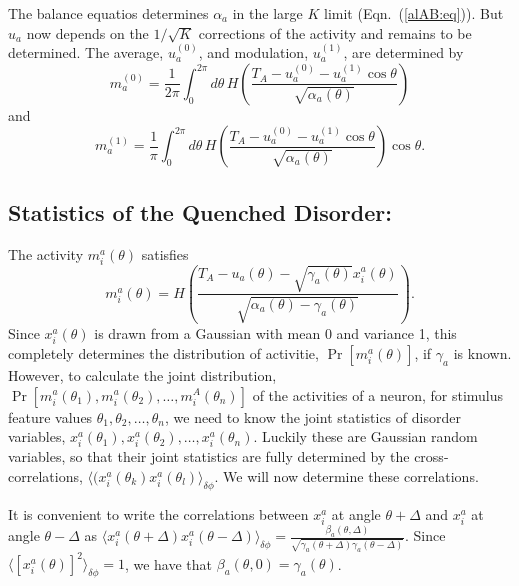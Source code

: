 The balance equatios determines $\alpha_a$ in the large $K$ limit (Eqn.~(\ref{alAB:eq})). 
But $u_a$ now depends on 
the $1/\sqrt{K}$ corrections of the activity and remains to be determined. 
The average, $u_a^{(0)}$, and modulation, $u_a^{(1)}$, are determined by
\begin{equation}
m_a^{(0)}=\frac{1}{2\pi}\int_0^{2\pi}\!d\theta\,
H\left(\frac{T_A-u_a^{(0)}-u_a^{(1)}\cos \theta}{\sqrt{\alpha_a(\theta)}}
\right)
\end{equation}
and
\begin{equation}
m_a^{(1)}=\frac{1}{\pi}\int_0^{2\pi}\!d\theta\,
H\left(\frac{T_A-u_a^{(0)}-u_a^{(1)}\cos \theta}{\sqrt{\alpha_a(\theta)}}
\right)\cos \theta.
\end{equation}

\subsection{Statistics of the Quenched Disorder:}
The activity $m_i^a(\theta)$ satisfies
\begin{equation}
m_i^a(\theta)=H\left(\frac{T_A-u_a(\theta)-\sqrt{\gamma_a(\theta)}
x_i^a(\theta)}{\sqrt{\alpha_a(\theta)-\gamma_a(\theta)}}\right).
\label{ind-rate:eq}
\end{equation}
Since $x_i^a(\theta)$ is drawn from a Gaussian with mean 0 and variance 1,
this completely determines the distribution of activitie, 
$\Pr[m_i^a(\theta)]$, if $\gamma_a$ is known. However, to calculate the joint 
distribution, $\Pr[m_i^a(\theta_1),m_i^a(\theta_2),\ldots,m_i^A(\theta_n)]$ of 
the activities of a neuron, for stimulus feature values 
$\theta_1,\theta_2,\ldots,\theta_n$, we need to know the joint statistics of 
disorder variables, $x_i^a(\theta_1),
x_i^a(\theta_2),\ldots,x_i^a(\theta_n)$\@. Luckily these are Gaussian 
random variables, so that their joint statistics are fully determined by the 
cross-correlations, 
$\langle(x_i^a(\theta_k)x_i^a(\theta_l)\rangle_{\delta\phi}$\@.
We will now determine these correlations.

It is convenient to write the correlations between $x_i^a$ at angle 
$\theta+\Delta$ and $x_i^a$ at angle $\theta-\Delta$ as
$\langle x_i^a(\theta+\Delta)x_i^a(\theta-\Delta)\rangle_{\delta\phi}=
\frac{\beta_a(\theta,\Delta)}
{\sqrt{\gamma_a(\theta+\Delta)\gamma_a(\theta-\Delta)}}$\@. Since
$\langle [x_i^a(\theta)]^2\rangle_{\delta\phi}=1$, we have that 
$\beta_a(\theta,0)=\gamma_a(\theta)$\@.

